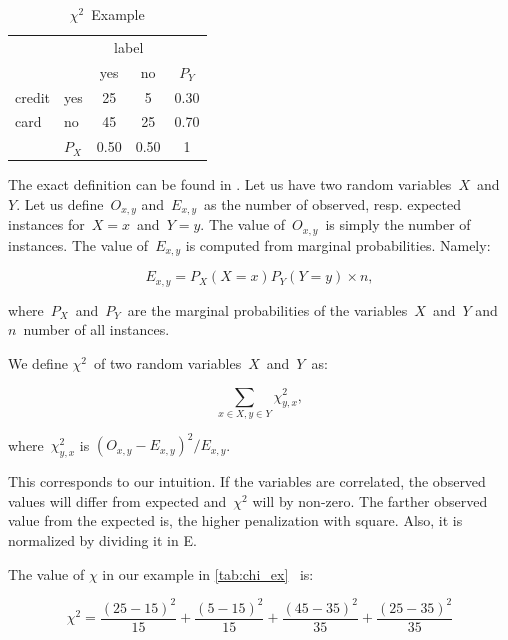 \begin{table}[h!]
 \center
 \begin{tabular}{|l|l|c|c|c}
 \cline{3-4}
        &       & \multicolumn{2}{c|}{label} & \\
        \cline{3-4}
        &       & yes        & no            & $P_Y$ \\
        \cline{1-4}
 credit & yes   & 25         & 5             & 0.30 \\
        \cline{2-4}
 card   & no    & 45         & 25            & 0.70 \\
        \cline{1-4}
        & $P_X$ & 0.50       & 0.50          & 1
 
 \end{tabular}
 \caption{$\chi^2$~Example}
 \label{tab:chi_ex}
\end{table}

The exact definition can be found in \citet{Hugh13}.
Let us have two random variables~$X$~and~$Y$.
Let us define~$O_{x,y}$ and~$E_{x,y}$~as the number of observed,
resp. expected instances for~$X=x$~and~$Y=y$.
The value of~$O_{x,y}$~is simply the number of instances.
The value of~$E_{x,y}$ is computed from marginal probabilities.
Namely:

\begin{equation}
E_{x,y} = P_X\left(X=x\right) P_Y\left(Y=y\right) \times n,
\end{equation}

where~$P_X$~and~$P_Y$~are the marginal probabilities of the variables~$X$~and~$Y$
and~$n$~number of all instances.

We define $\chi^2$~of two random variables~$X$~and~$Y$~as:

$$\sum_{x \in X, y \in Y}{\chi^2_{y,x}},$$

where~${\chi^2_{y,x}}$ is $\left(O_{x,y} - E_{x,y} \right)^ 2 / E_{x,y}$.

This corresponds to our intuition.
If the variables are correlated,
the observed values will differ from expected and~$\chi^2$ will by non-zero.
The farther observed value from the expected is, the higher penalization with square.
Also, it is normalized by dividing it in E.

The value of $\chi$ in our example in \autoref{tab:chi_ex}
~is:

\begin{equation}
\chi^2 = 
\frac{\left(25-15\right)^2}{15} +
\frac{\left(5-15\right)^2}{15} +
\frac{\left(45-35\right)^2}{35} +
\frac{\left(25-35\right)^2}{35}
\end{equation}

